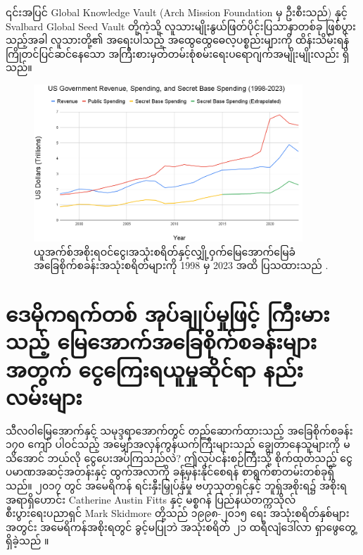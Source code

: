 \documentclass[10pt,twocolumn,letterpaper]{article}
\begin{document}
၎င်းအပြင် Global Knowledge Vault (Arch Mission Foundation မှ ဦးစီးသည်) \cite{29} နှင့် Svalbard Global Seed Vault \cite{30} တို့ကဲ့သို့ လူသားမျိုးနွယ်ဖြတ်ပိုင်းပြသာနာတစ်ခု ဖြစ်ပွားသည့်အခါ လူသားတို့၏ အရေးပါသည့် အထွေထွေဓေလ့ပစ္စည်းများကို ထိန်းသိမ်းရန် ကြိုတင်ပြင်ဆင်နေသော အကြီးစားမှတ်တမ်းစုံစမ်းရေးပရောဂျက်အမျိုးမျိုးလည်း ရှိသည်။
\begin{figure}[t]
\begin{center}
\includegraphics[width=0.9\textwidth]{govcrop2.png}
\end{center}
   \caption{ယူအက်စ်အစိုးရဝင်ငွေ၊အသုံးစရိတ်နှင့်လျှို့ဝှက်မြေအောက်မြေခံအခြေစိုက်စခန်းအသုံးစရိတ်များကို 1998 မှ 2023 အထိ ပြသထားသည် \cite{19}.}
   \label{fig:9}
\end{figure}
\section{ဒေမိုကရက်တစ် အုပ်ချုပ်မှုဖြင့် ကြီးမားသည့် မြေအောက်အခြေစိုက်စခန်းများအတွက် ငွေကြေးရယူမှုဆိုင်ရာ နည်းလမ်းများ}

သီလဝါမြေအောက်နှင့် သမုဒ္ဒရာအောက်တွင် တည်ဆောက်ထားသည့် အခြေစိုက်စခန်း ၁၇၀ ကျော် ပါဝင်သည့် အမျှော်အလှန်ကွန်ယက်ကြီးများသည် ချွေတာနေသူများကို မသိအောင် ဘယ်လို ငွေပေးအပ်ကြသည်လဲ? ဤလုပ်ငန်းစဉ်ကြီးသို့ စိုက်ထုတ်သည့် ငွေပမာဏအဆင့်အတန်းနှင့် ထွက်အလာကို ခန့်မှန်းနိုင်စေရန် စာရွက်စာတမ်းတစ်ခုရှိသည်။ ၂၀၁၇ တွင် အမေရိကန် ရင်းနှီးမြှုပ်နှံမှု ဗဟုသုတရှင်နှင့် ဘူရှ်အစိုးရ၌ အစိုးရအရာရှိဟောင်း Catherine Austin Fitts နှင့် မစ္စဂန် ပြည်နယ်တက္ကသိုလ် စီးပွားရေးပညာရှင် Mark Skidmore တို့သည် ၁၉၉၈-၂၀၁၅ ရေး အသုံးစရိတ်နှစ်များအတွင်း အမေရိကန်အစိုးရတွင် ခွင့်မပြုဘဲ အသုံးစရိတ် ၂၁ ထရီလျံဒေါ်လာ ရှာဖွေတွေ့ရှိခဲ့သည် \cite{11,12,13}။
\end{document}
